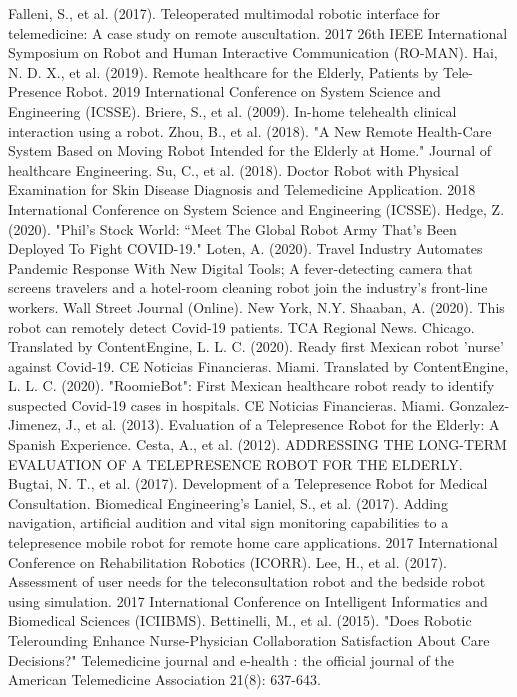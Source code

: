 \documentclass[a4paper]{article}
\begin{document}
\begin{thebibliography}{99}
    Falleni, S., et al. (2017). Teleoperated multimodal robotic interface for telemedicine: A case study on remote auscultation. 2017 26th IEEE International Symposium on Robot and Human Interactive Communication (RO-MAN).
    Hai, N. D. X., et al. (2019). Remote healthcare for the Elderly, Patients by Tele-Presence Robot. 2019 International Conference on System Science and Engineering (ICSSE).
    Briere, S., et al. (2009). In-home telehealth clinical interaction using a robot.
    Zhou, B., et al. (2018). "A New Remote Health-Care System Based on Moving Robot Intended for the Elderly at Home." Journal of healthcare Engineering.
    Su, C., et al. (2018). Doctor Robot with Physical Examination for Skin Disease Diagnosis and Telemedicine Application. 2018 International Conference on System Science and Engineering (ICSSE).
    Hedge, Z. (2020). "Phil's Stock World: “Meet The Global Robot Army That’s Been Deployed To Fight COVID-19."  
    Loten, A. (2020). Travel Industry Automates Pandemic Response With New Digital Tools; A fever-detecting camera that screens travelers and a hotel-room cleaning robot join the industry's front-line workers. Wall Street Journal (Online). New York, N.Y.
	Shaaban, A. (2020). This robot can remotely detect Covid-19 patients. TCA Regional News. Chicago.
	Translated by ContentEngine, L. L. C. (2020). Ready first Mexican robot 'nurse' against Covid-19. CE Noticias Financieras. Miami.
    Translated by ContentEngine, L. L. C. (2020). "RoomieBot": First Mexican healthcare robot ready to identify suspected Covid-19 cases in hospitals. CE Noticias Financieras. Miami.
    Gonzalez-Jimenez, J., et al. (2013). Evaluation of a Telepresence Robot for the Elderly: A Spanish Experience.
    Cesta, A., et al. (2012). ADDRESSING THE LONG-TERM EVALUATION OF A TELEPRESENCE ROBOT FOR THE ELDERLY.
    Bugtai, N. T., et al. (2017). Development of a Telepresence Robot for Medical Consultation. Biomedical Engineering's
    Laniel, S., et al. (2017). Adding navigation, artificial audition and vital sign monitoring capabilities to a telepresence mobile robot for remote home care applications. 2017 International Conference on Rehabilitation Robotics (ICORR).
    Lee, H., et al. (2017). Assessment of user needs for the teleconsultation robot and the bedside robot using simulation. 2017 International Conference on Intelligent Informatics and Biomedical Sciences (ICIIBMS).
	Bettinelli, M., et al. (2015). "Does Robotic Telerounding Enhance Nurse-Physician Collaboration Satisfaction About Care Decisions?" Telemedicine journal and e-health : the official journal of the American Telemedicine Association 21(8): 637-643.

\end{thebibliography}
\end{document}
